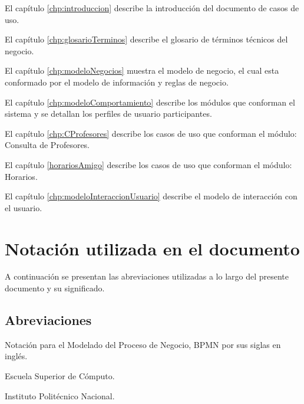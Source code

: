 \begin{Citemize}
	
	\item El capítulo \ref{chp:introduccion} describe la introducción del documento de casos de uso.
	
	\item El capítulo \ref{chp:glosarioTerminos} describe el glosario de términos técnicos del negocio.
	
	\item El capítulo \ref{chp:modeloNegocios}  muestra el modelo de negocio, el cual esta conformado por el modelo de información y reglas de negocio.
	
	\item El capítulo \ref{chp:modeloComportamiento} describe los módulos que conforman el sistema y se detallan los perfiles de usuario participantes.
	
	\item El capítulo \ref{chp:CProfesores} describe los casos de uso que conforman el módulo: Consulta de Profesores.
	
	\item El capítulo \ref{horariosAmigo} describe los casos de uso que conforman el módulo: Horarios.
	
	\item El capítulo \ref{chp:modeloInteraccionUsuario} describe el modelo de interacción con el usuario.
	
\end{Citemize}

\section{Notación utilizada en el documento}\label{sec:notacion}

A continuación se presentan las abreviaciones utilizadas a lo largo del presente documento y su significado.

\subsection{Abreviaciones}\label{ssec:abreviaciones}

\begin{description}

	 Notación para el Modelado del Proceso de Negocio, BPMN por sus siglas en inglés.
	
	 Escuela Superior de Cómputo. 
	
	 Instituto Politécnico Nacional.

\end{description}

